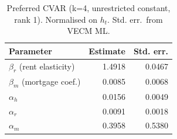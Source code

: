 \begin{table}[H]
\centering
\caption{Preferred CVAR (k=4, unrestricted constant, rank 1). Normalised on $h_t$. Std. err.\ from VECM ML.}
\label{tab:cvar_estimates}
\begin{tabular}{lrr}
\toprule
Parameter & Estimate & Std. err. \\
\midrule
$\beta_r$ (rent elasticity) & 1.4918 & 0.0467 \\
$\beta_m$ (mortgage coef.) & 0.0085 & 0.0068 \\
$\alpha_h$ & 0.0156 & 0.0049 \\
$\alpha_r$ & 0.0091 & 0.0018 \\
$\alpha_m$ & 0.3958 & 0.5380 \\
\bottomrule
\end{tabular}
\end{table}
